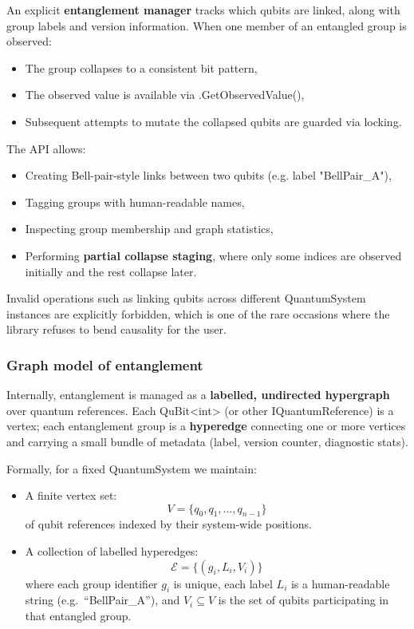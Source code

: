 \documentclass[a4paper,11pt]{article}
\begin{document}
An explicit \textbf{entanglement manager} tracks which qubits are linked, along with group labels and version information. When one member of an entangled group is observed:

\begin{itemize}
\item
  The group collapses to a consistent bit pattern,
\item
  The observed value is available via .GetObservedValue(),
\item
  Subsequent attempts to mutate the collapsed qubits are guarded via locking.
\end{itemize}

The API allows:

\begin{itemize}
\item
  Creating Bell-pair-style links between two qubits (e.g. label "BellPair\_A"),
\item
  Tagging groups with human-readable names,
\item
  Inspecting group membership and graph statistics,
\item
  Performing \textbf{partial collapse staging}, where only some indices are observed initially and the rest collapse later.
\end{itemize}

Invalid operations such as linking qubits across different QuantumSystem instances are explicitly forbidden, which is one of the rare occasions where the library refuses to bend causality for the user.

\subsubsection{Graph model of entanglement}

Internally, entanglement is managed as a \textbf{labelled, undirected hypergraph} over quantum references. Each QuBit\textless int\textgreater{} (or other IQuantumReference) is a vertex; each entanglement group is a \textbf{hyperedge} connecting one or more vertices and carrying a small bundle of metadata (label, version counter, diagnostic stats).

Formally, for a fixed QuantumSystem we maintain:

\begin{itemize}
\item
  A finite vertex set:
  \[
  V = \{ q_{0}, q_{1}, \ldots, q_{n-1} \}
  \]
  of qubit references indexed by their system-wide positions.

\item
  A collection of labelled hyperedges:
  \[
  \mathcal{E} = \{(g_{i}, L_{i}, V_{i})\}
  \]
  where each group identifier $g_{i}$ is unique, each label $L_{i}$ is a human-readable
  string (e.g.\ “BellPair\_A”), and $V_{i}\subseteq V$ is the set of qubits
  participating in that entangled group.
\end{itemize}
\end{document}
